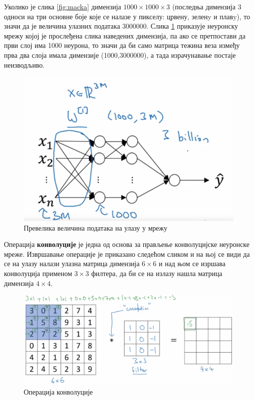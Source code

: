 \documentclass[12pt, а4paper]{article}
\begin{document}
Уколико је слика \ref{fig:macka} димензија $1000 \times 1000 \times 3$
(последња димензија 3 односи на три основне боје
које се налазе у пикселу: црвену, зеленy и плавy),
то значи да је величина улазних података 3000000. Слика \ref{fig:ng_FCVision}
приказује неуронску мрежу којој је прослеђена слика наведених димензија, па
ако се претпостави да први слој има 1000 неурона, то значи да би само матрица
тежина веза између прва два слоја имала димензије (1000,3000000), а тада израчунавање
постаје неизводљиво.

\begin{figure}[H]
  \centering
      \includegraphics[scale=0.45]{slike/ngFCVision.png}
  \caption{Превелика величина података на улазу у мрежу}
  \label{fig:ng_FCVision}
\end{figure}

Операција \textbf{конволуције} је једна од основа за прављење конволуцијске
неуронске мреже. Извршавање операције је приказано следећом сликом и на њој се
види да се на улазу налази улазна матрица димензија $6\times6$ и над њом
се изршава конволуција применом $3\times3$ филтера, да би се на излазу нашла матрица
димензија $4\times4$.

\begin{figure}[H]
  \centering
      \includegraphics[scale=0.35]{slike/ngKonvoucija.png}
  \caption{Операција конволуције}
  \label{fig:ng_Kovolucija}
\end{figure}
\end{document}
